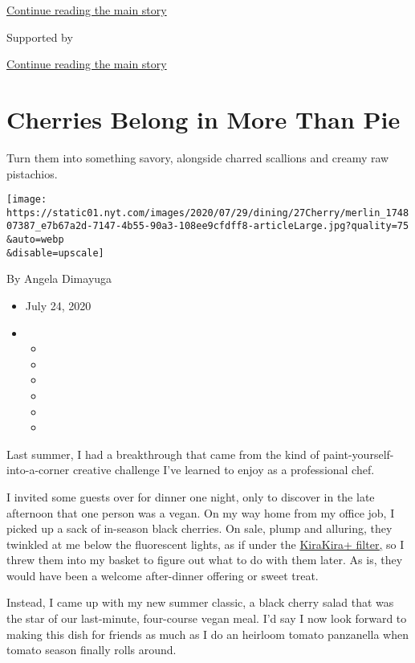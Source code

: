 \protect\hyperlink{after-top}{Continue reading the main story}

Supported by

\protect\hyperlink{after-sponsor}{Continue reading the main story}

\hypertarget{cherries-belong-in-more-than-pie}{%
\section{Cherries Belong in More Than
Pie}\label{cherries-belong-in-more-than-pie}}

Turn them into something savory, alongside charred scallions and creamy
raw pistachios.

\texttt{[image: https://static01.nyt.com/images/2020/07/29/dining/27Cherry/merlin\_174807387\_e7b67a2d-7147-4b55-90a3-108ee9cfdff8-articleLarge.jpg?quality=75\\\&auto=webp\\\&disable=upscale]}

By Angela Dimayuga

\begin{itemize}
\item
  July 24, 2020
\item
  \begin{itemize}
  \item
  \item
  \item
  \item
  \item
  \item
  \end{itemize}
\end{itemize}

Last summer, I had a breakthrough that came from the kind of
paint-yourself-into-a-corner creative challenge I've learned to enjoy as
a professional chef.

I invited some guests over for dinner one night, only to discover in the
late afternoon that one person was a vegan. On my way home from my
office job, I picked up a sack of in-season black cherries. On sale,
plump and alluring, they twinkled at me below the fluorescent lights, as
if under the
\href{https://www.nytimes.com/2018/03/24/style/app-kirakira-iphone.html}{KiraKira+
filter,} so I threw them into my basket to figure out what to do with
them later. As is, they would have been a welcome after-dinner offering
or sweet treat.

Instead, I came up with my new summer classic, a black cherry salad that
was the star of our last-minute, four-course vegan meal. I'd say I now
look forward to making this dish for friends as much as I do an heirloom
tomato panzanella when tomato season finally rolls around.

